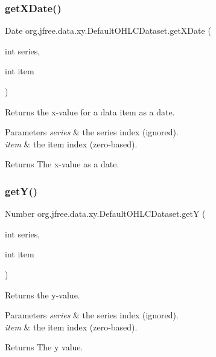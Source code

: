\subsubsection{\texorpdfstring{get\+X\+Date()}{getXDate()}}
{\footnotesize\ttfamily Date org.\+jfree.\+data.\+xy.\+Default\+O\+H\+L\+C\+Dataset.\+get\+X\+Date (\begin{DoxyParamCaption}\item[{int}]{series,  }\item[{int}]{item }\end{DoxyParamCaption})}

Returns the x-\/value for a data item as a date.


\begin{DoxyParams}{Parameters}
{\em series} & the series index (ignored). \\
\hline
{\em item} & the item index (zero-\/based).\\
\hline
\end{DoxyParams}
\begin{DoxyReturn}{Returns}
The x-\/value as a date. 
\end{DoxyReturn}
\mbox{\label{classorg_1_1jfree_1_1data_1_1xy_1_1_default_o_h_l_c_dataset_aa36cc16a07371b3e5027f2a9343bb24f}} 
\subsubsection{\texorpdfstring{get\+Y()}{getY()}}
{\footnotesize\ttfamily Number org.\+jfree.\+data.\+xy.\+Default\+O\+H\+L\+C\+Dataset.\+getY (\begin{DoxyParamCaption}\item[{int}]{series,  }\item[{int}]{item }\end{DoxyParamCaption})}

Returns the y-\/value.


\begin{DoxyParams}{Parameters}
{\em series} & the series index (ignored). \\
\hline
{\em item} & the item index (zero-\/based).\\
\hline
\end{DoxyParams}
\begin{DoxyReturn}{Returns}
The y value. 
\end{DoxyReturn}


